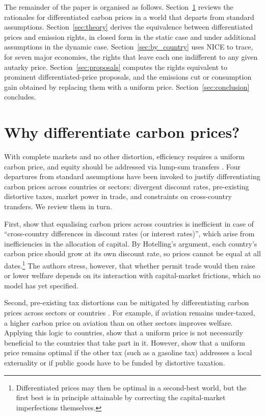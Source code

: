 \documentclass[12pt,english]{article}
\theoremstyle{remark}
\begin{document}
The remainder of the paper is organised as follows. Section~\ref{sec:arguments} reviews the rationales for differentiated carbon prices in a world that departs from standard assumptions. Section~\ref{sec:theory} derives the equivalence between differentiated prices and emission rights, in closed form in the static case and under additional assumptions in the dynamic case. Section~\ref{sec:by_country} uses NICE to trace, for seven major economies, the rights that leave each one indifferent to any given autarky price. Section~\ref{sec:proposals} computes the rights equivalent to prominent differentiated-price proposals, and the emissions cut or consumption gain obtained by replacing them with a uniform price. Section~\ref{sec:conclusion} concludes.

\section{Why differentiate carbon prices?}
\label{sec:arguments}

With complete markets and no other distortion,
efficiency requires a uniform carbon price, and equity should be addressed via lump-sum transfers \citep{sandmo_global_2007}.
Four departures from standard assumptions have been invoked to justify differentiating carbon prices across countries or sectors: divergent discount rates, pre-existing distortive taxes, market power in trade, and constraints on cross-country transfers. We review them in turn.

First, \citet{anthoff_differentiated_2026} show that equalising carbon prices across countries is inefficient in case of ``cross-country differences in discount rates (or interest rates)'', which arise from inefficiencies in the allocation of capital. By Hotelling's argument, each country's carbon price should grow at its own discount rate, so prices cannot be equal at all dates.\footnote{Differentiated prices may then be optimal in a second-best world, but the first best is in principle attainable by correcting the capital-market imperfections themselves.} The authors stress, however, that whether permit trade would then raise or lower welfare depends on its interaction with capital-market frictions, which no model has yet specified.

Second, pre-existing tax distortions can be mitigated by differentiating carbon prices across sectors or countries \citep{babiker_is_2004,boeters_optimally_2014}. For example, if aviation remains under-taxed, a higher carbon price on aviation than on other sectors improves welfare. Applying this logic to countries, \citet{babiker_is_2004} show that a uniform price is not necessarily beneficial to the countries that take part in it. However, \citet{dautume_should_2016} show that a uniform price remains optimal if the other tax (such as a gasoline tax) addresses a local externality or if public goods have to be funded by distortive taxation.
\end{document}
